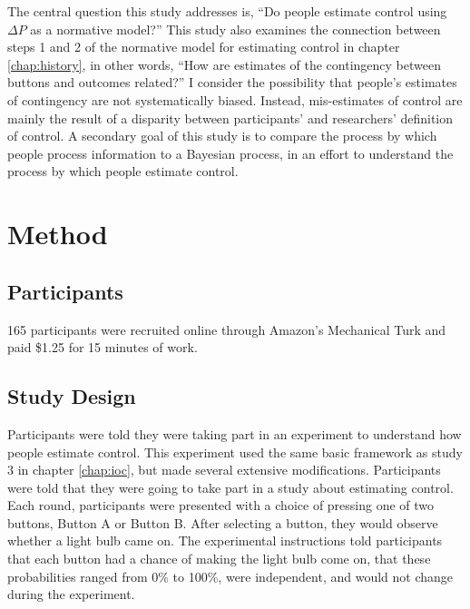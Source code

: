 \documentclass[USenglish,letterpaper,12pt,extrafontsizes,oneside,onecolumn,final]{memoir}
\newcommand{\deltap}{$\Delta P$}
\begin{document}
The central question this study addresses is, ``Do people estimate control using \deltap \xspace as a normative model?'' This study also examines the connection between steps 1 and 2 of the normative model for estimating control in chapter \ref{chap:history}, in other words,  ``How are estimates of the contingency between buttons and outcomes related?''  I consider the possibility that people's estimates of contingency are not systematically biased.  Instead, mis-estimates of control are mainly the result of a disparity between participants' and researchers' definition of control.  A secondary goal of this study is to compare the process by which people process information to a Bayesian process, in an effort to understand the process by which people estimate control.

\section{Method}

\subsection{Participants}
165 participants were recruited online through Amazon's Mechanical Turk and paid \$1.25 for 15 minutes of work.

\subsection{Study Design}

Participants were told they were taking part in an experiment to understand how people estimate control. This experiment used the same basic framework as study 3 in chapter \ref{chap:ioc}, but made several extensive modifications.  Participants were told that they were going to take part in a study about estimating control.  Each round, participants were presented with a choice of pressing one of two buttons, Button A or Button B.  After selecting a button, they would observe whether a light bulb came on.  The experimental instructions told participants that each button had a chance of making the light bulb come on, that these probabilities ranged from 0\% to 100\%, were independent, and would not change during the experiment.
\end{document}
